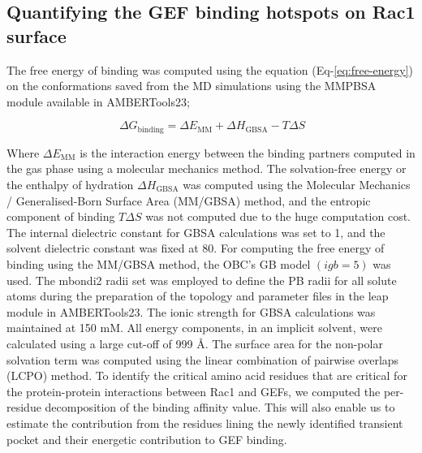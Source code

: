 \documentclass[12pt, a4paper]{achemso}
\begin{document}
\subsection{Quantifying the GEF binding hotspots on Rac1 surface} 

The free energy of binding was computed using the equation (Eq-\ref{eq:free-energy}) on the conformations saved from the MD simulations using the MMPBSA module\cite{mmpbsa} available in AMBERTools23; 

\begin{equation} \label{eq:free-energy}
     \   {\Delta}G_{\text{binding}} = {\Delta}E_{\text{MM}} + {\Delta}H_{\text{GBSA}} - T{\Delta}S   
\end{equation}

Where  \({\Delta}E_{\text{MM}}\) is the interaction energy between the binding partners computed in the gas phase using a molecular mechanics method.  The solvation-free energy or the enthalpy of hydration \({\Delta}H_{\text{GBSA}}\)  was computed using the Molecular Mechanics / Generalised-Born Surface Area (MM/GBSA) method, and the entropic component of binding \(T{\Delta}S\) was not computed due to the huge computation cost. The internal dielectric constant for GBSA calculations was set to 1, and the solvent dielectric constant was fixed at 80. For computing the free energy of binding using the MM/GBSA method, the OBC’s GB model\cite{igb5} $ (igb = 5) $ was used. The mbondi2 radii set was employed to define the PB radii for all solute atoms during the preparation of the topology and parameter files in the leap module in AMBERTools23. The ionic strength for  GBSA calculations was maintained at 150 mM. All energy components, in an implicit solvent, were calculated using a large cut-off of 999 \r{A}. The surface area for the non-polar solvation term was computed using the linear combination of pairwise overlaps (LCPO) method\cite{lcpo}. To identify the critical amino acid residues that are critical for the protein-protein interactions between Rac1 and GEFs, we computed the per-residue decomposition of the binding affinity value. This will also enable us to estimate the contribution from the residues lining the newly identified transient pocket and their energetic contribution to GEF binding.
\end{document}
